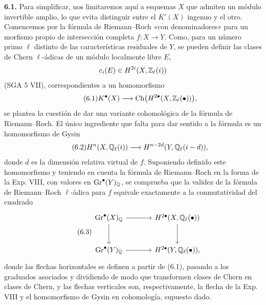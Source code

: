 \textbf{6.1.} Para simplificar, nos limitaremos aquí a esquemas $X$ que
admiten un módulo invertible amplio, lo que evita distinguir entre el
$K'(X)$ ingenuo y el otro. Comencemos por la fórmula de Riemann--Roch «con
denominadores» para un morfismo propio de intersección completa $f:X\to Y$.
Como, para un número primo $\ell$ distinto de las características residuales
de $Y$, se pueden definir las clases de Chern $\ell$-ádicas de un módulo
localmente libre $E$,
\[
c_i(E)\in H^{2i}(X,\mathbb Z_\ell(i))
\]
(SGA 5 VII), correspondientes a un homomorfismo
\begin{equation}\tag{6.1}
K^\bullet(X)\longrightarrow\operatorname{Ch}\bigl(H^{2\bullet}(X,\mathbb Z_\ell(\bullet))\bigr),
\end{equation}
se plantea la cuestión de dar una variante cohomológica de la fórmula de
Riemann--Roch. El único ingrediente que falta para dar sentido a la fórmula
es un homomorfismo de Gysin
\begin{equation}\tag{6.2}
H^n(X,\mathbb Q_\ell(i))\longrightarrow H^{n-2d}(Y,\mathbb Q_\ell(i-d)),
\end{equation}
donde $d$ es la dimensión relativa virtual de $f$. Suponiendo definido este
homomorfismo y teniendo en cuenta la fórmula de Riemann--Roch en la forma de
la Exp. VIII, con valores en $\operatorname{Gr}^\bullet(Y)_\mathbb Q$, se comprueba que la
validez de la fórmula de Riemann--Roch $\ell$-ádica para $f$ equivale
exactamente a la conmutatividad del cuadrado
\begin{equation}\tag{6.3}
\begin{tikzcd}[column sep=large,row sep=large]
\operatorname{Gr}^\bullet(X)_{\Q} \arrow[r] \arrow[d] &
H^{2\bullet}(X,\Qell(\bullet)) \arrow[d] \\
\operatorname{Gr}^\bullet(Y)_{\Q} \arrow[r] &
H^{2\bullet}(Y,\Qell(\bullet)),
\end{tikzcd}
\end{equation}
donde las flechas horizontales se definen a partir de (6.1), pasando a los
graduados asociados y dividiendo de modo que transformen clases de Chern en
clases de Chern, y las flechas verticales son, respectivamente, la flecha de
la Exp. VIII y el homomorfismo de Gysin en cohomología, supuesto dado.

